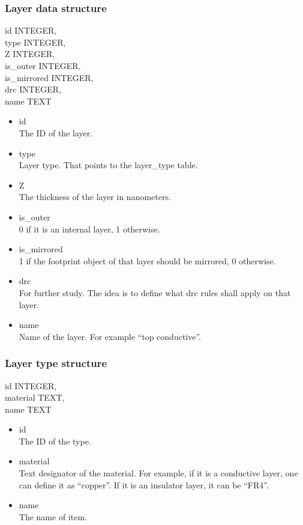 \documentclass[12pt]{article}
\begin{document}
\subsubsection{Layer data structure}\label{layer-data-structure}

id INTEGER,\\
type INTEGER,\\
Z INTEGER,\\
is\_outer INTEGER,\\
is\_mirrored INTEGER,\\
drc INTEGER,\\
name TEXT

\begin{itemize}
\item id\\
The ID of the layer.
\item type\\
Layer type. That points to the layer\_type table.
\item Z\\
The thickness of the layer in nanometers.
\item is\_outer\\
0 if it is an internal layer, 1 otherwise.
\item is\_mirrored\\
1 if the footprint object of that layer should be mirrored, 0 otherwise.
\item drc\\
For further study. The idea is to define what drc rules shall apply on that layer.
\item name\\
Name of the layer. For example ``top conductive''.
\end{itemize}

\subsubsection{Layer type structure}

id INTEGER,\\
material TEXT,\\
name TEXT

\begin{itemize}
\item id\\
The ID of the type.
\item
  material\\ Text designator of the material. For example, if it is a
  conductive layer, one can define it as ``copper''. If it is an
  insulator layer, it can be ``FR4''.
\item name\\
The name of item.
\end{itemize}
\end{document}
